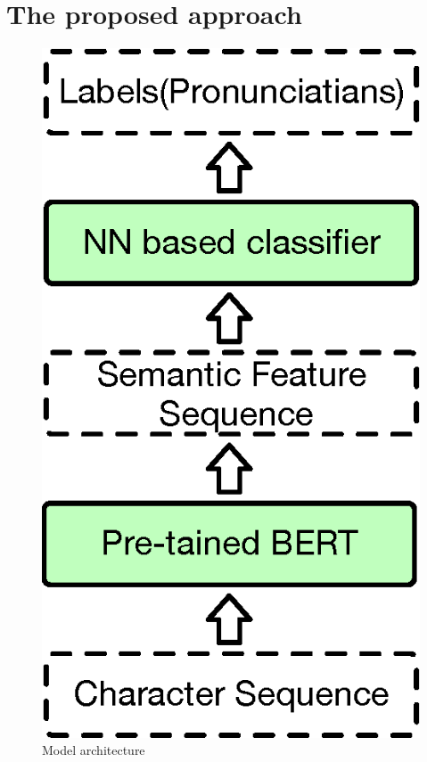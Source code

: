 \documentclass[a4paper]{article}
\begin{document}
\section{The proposed approach}

\begin{figure}[t]
	\centering
	\includegraphics[scale=0.35]{pics3/architecture2.eps}
	\caption{Model architecture}
	\label{fig:model_architecture}
\end{figure}
\end{document}
